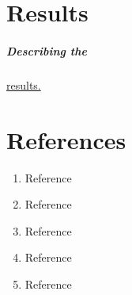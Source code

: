 \documentclass[11pt, a4paper]{article}
\begin{document}
\chapter{Results}
\paragraph{Describing the}\underline{results.}


\chapter{References}
\begin{enumerate}
\item{Reference}
\item{Reference}
\item{Reference}
\item{Reference}
\item{Reference}
\end{enumerate}
\end{document}

